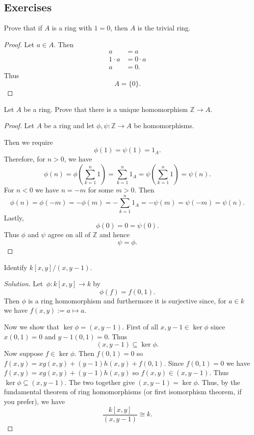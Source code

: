 \documentclass[11pt]{article}
\begin{document}
\subsection*{Exercises}

\begin{prob}
    Prove that if $A$ is a ring with $1 = 0$, then 
    $A$ is the trivial ring. 
\end{prob}
\begin{proof}
    Let $a \in A$. Then 
    \begin{align*}
        a &= a \\ 
        1 \cdot a &= 0 \cdot a \\ 
        a &= 0. 
    \end{align*}
    Thus 
    \[
        A = \{0\}.
    \]
\end{proof}

\begin{prob}
    Let $A$ be a ring. Prove that there is a unique 
    homomorphism $\mathbb Z \to A$. 
\end{prob}
\begin{proof}
    Let $A$ be a ring and 
    let $\phi, \psi : \mathbb Z \to A$ be homomorphisms. 

    Then we require 
    \[
        \phi(1) = \psi(1) = 1_A. 
    \]
    Therefore, for $n > 0$, we have 
    \[
        \phi(n) = \phi\left(\sum_{k=1}^n 1\right) 
        = \sum_{k=1}^n 1_A 
        = \psi\left(\sum_{k=1}^n 1\right) 
        = \psi(n). 
    \]
    For $n < 0$ we have $n = -m$ for some 
    $m > 0$. Then 
    \[
        \phi(n) = \phi(-m) = -\phi(m) 
        = - \sum_{k=1}^n 1_A 
        = -\psi(m) = \psi(-m) = \psi(n).
    \]
    Lastly, 
    \[
        \phi(0) = 0 = \psi(0). 
    \]
    Thus $\phi$ and $\psi$ agree on all 
    of $\mathbb Z$ and hence 
    \[
        \psi = \phi. 
    \]
\end{proof}

\begin{prob}
    Identify $k[x,y] / (x,y-1)$. 
\end{prob}
\begin{proof}[Solution]
    Let $\phi : k[x,y] \to k$ by 
    \[
        \phi(f) = f(0,1). 
    \]
    Then $\phi$ is a ring homomorphism and 
    furthermore it is surjective since, for 
    $a \in k$ we have $f(x,y) := a \mapsto a$. 

    Now we show that 
    $\ker \phi = (x,y-1)$. First of all 
    $x, y-1 \in \ker \phi$ since $x(0,1) = 0$ and 
    $y-1(0,1) = 0$. Thus 
    \[
        (x,y-1) \subseteq \ker \phi.
    \]
    Now suppose $f \in \ker \phi$. Then 
    $f(0,1) = 0$ so $f(x,y) = xg(x,y) + (y-1)h(x,y) + 
    f(0,1)$. Since $f(0,1) = 0$ we have $f(x,y) = xg(x,y) + 
    (y-1)h(x,y)$ so $f(x,y) \in (x, y-1)$. Thus 
    $\ker \phi \subseteq (x,y-1)$. The two together give 
    $(x,y-1) = \ker \phi$. 
    Thus, by the fundamental theorem of ring homomorphisms 
    (or first isomorphism theorem, if you prefer), we have 
    \[
        \frac{k[x,y]}{(x,y-1)} \cong 
        k.
    \]
\end{proof}
\end{document}
